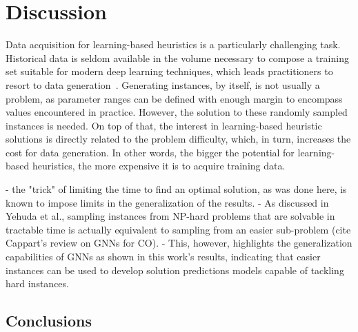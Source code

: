 

\chapter{Discussion}

Data acquisition for learning-based heuristics is a particularly challenging task. 
Historical data is seldom available in the volume necessary to compose a training set suitable for modern deep learning techniques, which leads practitioners to resort to data generation~\cite{bengioMachineLearningCombinatorial2021}.
Generating instances, by itself, is not usually a problem, as parameter ranges can be defined with enough margin to encompass values encountered in practice.
However, the solution to these randomly sampled instances is needed.
On top of that, the interest in learning-based heuristic solutions is directly related to the problem difficulty, which, in turn, increases the cost for data generation.
In other words, the bigger the potential for learning-based heuristics, the more expensive it is to acquire training data.

- the "trick" of limiting the time to find an optimal solution, as was done here, is known to impose limits in the generalization of the results.
- As discussed in Yehuda et al., sampling instances from NP-hard problems that are solvable in tractable time is actually equivalent to sampling from an easier sub-problem (cite Cappart's review on GNNs for CO). 
- This, however, highlights the generalization capabilities of GNNs as shown in this work's results, indicating that easier instances can be used to develop solution predictions models capable of tackling hard instances.

\section{Conclusions}


